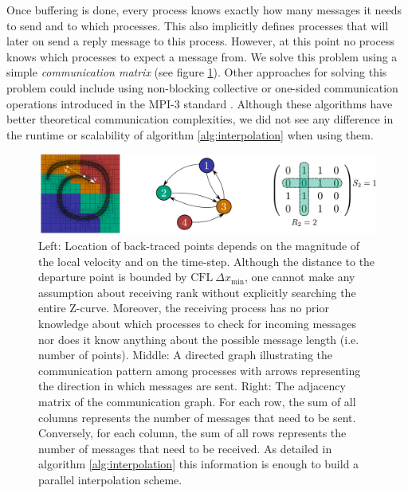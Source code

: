 Once buffering is done, every process knows exactly how many messages it needs to send and to which processes. This also implicitly defines processes that will later on send a reply message to this process. However, at this point no process knows which processes to expect a message from. We solve this problem using a simple \textit{communication matrix} (see figure \ref{fig:communication}). Other approaches for solving this problem could include using non-blocking collective or one-sided communication operations introduced in the MPI-3 standard \cite{Hoefler;Siebert;Lumsdaine:10:Scalable-communication}. Although these algorithms have better theoretical communication complexities, we did not see any difference in the runtime or scalability of algorithm \ref{alg:interpolation} when using them. 

\begin{figure}[htbp]
\begin{center}
\includegraphics[width = \textwidth] {figures/communication.pdf}
\end{center}
\caption{Left: Location of back-traced points depends on the magnitude of the local velocity and on the time-step. Although the distance to the departure point is bounded by $\text{CFL} \: \Delta x_{\min}$, one cannot make any assumption about receiving rank without explicitly searching the entire Z-curve. Moreover, the receiving process has no prior knowledge about which processes to check for incoming messages nor does it know anything about the possible message length (i.e. number of points). Middle: A directed graph illustrating the communication pattern among processes with arrows representing the direction in which messages are sent. Right: The adjacency matrix of the communication graph. For each row, the sum of all columns represents the number of messages that need to be sent. Conversely, for each column, the sum of all rows represents the number of messages that need to be received. As detailed in algorithm \ref{alg:interpolation} this information is enough to build a parallel interpolation scheme.}
\label{fig:communication}
\end{figure}

